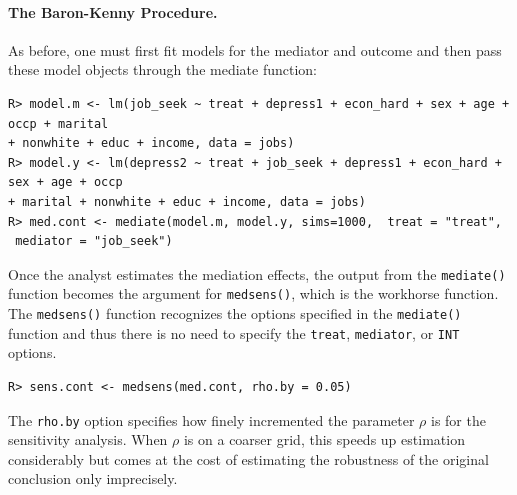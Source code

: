\documentclass[11pt,letterpaper]{article}
\theoremstyle{plain}
\begin{document}
\paragraph{The Baron-Kenny Procedure.}
As before, one must first fit models for the mediator and outcome and then pass these model objects through the mediate function:
\begin{verbatim}
R> model.m <- lm(job_seek ~ treat + depress1 + econ_hard + sex + age + occp + marital
+ nonwhite + educ + income, data = jobs)
R> model.y <- lm(depress2 ~ treat + job_seek + depress1 + econ_hard + sex + age + occp
+ marital + nonwhite + educ + income, data = jobs)
R> med.cont <- mediate(model.m, model.y, sims=1000,  treat = "treat",
 mediator = "job_seek")
\end{verbatim}

Once the analyst estimates the mediation effects, the output from the
{\tt mediate()} function becomes the argument for \texttt{medsens()},
which is the workhorse function. The {\tt medsens()} function
recognizes the options specified in the {\tt mediate()} function and
thus there is no need to specify the \texttt{treat}, \texttt{mediator}, or
\texttt{INT} options.
\begin{verbatim}
R> sens.cont <- medsens(med.cont, rho.by = 0.05)
\end{verbatim}
The \texttt{rho.by} option specifies how finely incremented the parameter $\rho$
is for the sensitivity analysis. When $\rho$ is on a coarser grid, this speeds
up estimation considerably but comes at the cost of estimating the
robustness of the original conclusion only imprecisely.  
\end{document}

